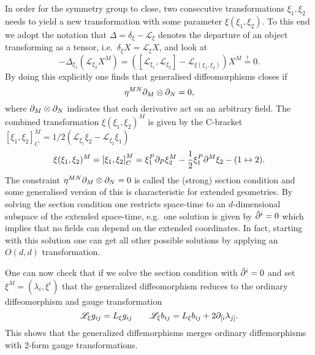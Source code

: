 In order for the symmetry group to close, two consecutive transformations $\xi_1,\xi_2$ needs to yield a new transformation with some parameter $\xi(\xi_1,\xi_2)$. To this end we adopt the notation that $\Delta=\delta_\xi-\mathscr{L}_\xi$ denotes the departure of an object transforming as a tensor, i.e.\ $\delta_\xi X = \mathscr{L}_\xi X$, and look at 
\begin{equation}
    -\Delta_{\xi_1}(\mathscr{L}_{\xi_2} X^M) = \left(\left[\mathscr{L}_{\xi_1},\mathscr{L}_{\xi_2}\right]-\mathscr{L}_{\xi(\xi_1,\xi_2)}\right)X^M \overset{!}{=} 0.
\end{equation}
By doing this explicitly one finds that generalised diffeomorphisms closes if 
\begin{equation}
    \eta^{MN}\partial_M\otimes\partial_N = 0,
\end{equation}
where $\partial_M \otimes \partial_N$ indicates that each derivative act on an arbitrary field. The combined transformation $\xi(\xi_1,\xi_2)^M$ is given by the C-bracket $\left[\xi_1,\xi_2\right]_C^M = 1/2(\mathcal{L}_{\xi_1}\xi_2-\mathcal{L}_{\xi_2}\xi_1)$
\begin{equation}
    \xi(\xi_1,\xi_2)^M = \left[\xi_1,\xi_2\right]_C^M = \xi_1^P\partial_P\xi_2^M-\frac{1}{2}\xi_1^P\partial^M\xi_{2}-(1\leftrightarrow 2).
\end{equation}
The constraint $\eta^{MN}\partial_M\otimes\partial_N=0$ is called the (strong) section condition and some generalised version of this is characteristic for extended geometries. By solving the section condition one restricts space-time to an $d$-dimensional subspace of the extended space-time, e.g.\ one solution is given by $\tilde{\partial}^i=0$ which implies that no fields can depend on the extended coordinates. In fact, starting with this solution one can get all other possible solutions by applying an $O(d,d)$ transformation. 

One can now check that if we solve the section condition with $\tilde{\partial}^i=0$ and set $\xi^M = (\lambda_i,\xi^i)$ that the generalized diffeomorphism reduces to the ordinary diffeomorphism and gauge transformation 
\begin{equation}
    \mathscr{L}_\xi g_{ij} = L_\xi g_{ij} \qquad \mathscr{L}_\xi b_{ij} = L_\xi b_{ij}+2\partial_{[i}\lambda_{j]}.
\end{equation}
This shows that the generalized diffemorphisms merges ordinary diffemorphisms with 2-form gauge transformations. 





